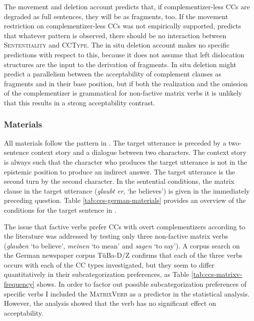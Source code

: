 The movement and deletion account predicts that, if complementizer-less CCs are degraded as full sentences, they will be as fragments, too. If the movement restriction on complementizer-less CCs was not empirically supported, \citet{merchant2004} predicts that whatever pattern is observed, there should be no interaction between \textsc{Sententiality} and \textsc{CCType}. The in situ deletion account makes no specific predictions with respect to this, because it does not assume that left dislocation structures are the input to the derivation of fragments. In situ deletion might predict a parallelism between the acceptability of complement clauses as fragments and in their base position, but if both the realization and the omission of the complementizer is grammatical for non-factive matrix verbs it is unlikely that this results in a strong acceptability contrast.

\subsubsection{Materials}\label{sec:ccs-materials}
All materials follow the pattern in \Last. The target utterance is preceded by a two-sentence context story and a dialogue between two characters. The context story is always such that the character who produces the target utterance is not in the epistemic position to produce an indirect answer. The target utterance is the second turn by the second character. In the sentential conditions, the matrix clause in the target utterance (\textit{glaubt er}, `he believes') is given in the immediately preceding question. Table \ref{tab:ccs-german-materials} provides an overview of the conditions for the target sentence in \Last.

The issue that factive verbs prefer CCs with overt complementizers according to the literature \citep{kiparsky.kiparsky1970, hegarty1992} was addressed by testing only three non-factive matrix verbs (\textit{glauben} `to believe’, \textit{meinen} `to mean' and \textit{sagen} `to say'). A corpus search on the German newspaper corpus TüBa-D/Z \citep{telljohann.etal2004} confirms that each of the three verbs occurs with each of the CC types investigated, but they seem to differ quantitatively in their subcategorization preferences, as Table \ref{tab:ccs-matrixv-frequency} shows. In order to factor out possible subcategorization preferences of specific verbs I included the \textsc{MatrixVerb} as a predictor in the statistical analysis. However, the analysis showed that the verb has no significant effect on acceptability.

